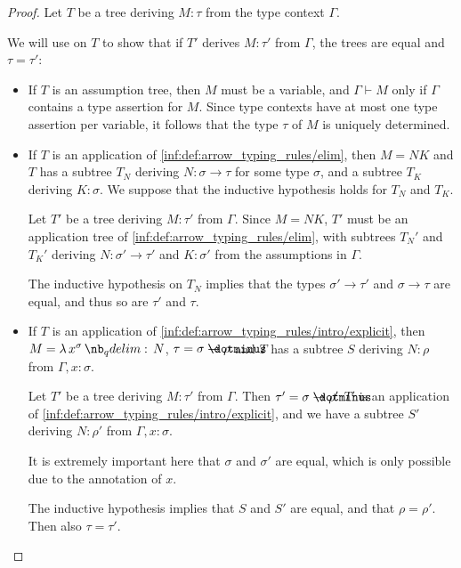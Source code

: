 \begin{proof}
  Let \( T \) be a tree deriving \( M: \tau \) from the type context \( \Gamma \).

  We will use  on \( T \) to show that if \( T' \) derives \( M: \tau' \) from \( \Gamma \), the trees are equal and \( \tau = \tau' \):
  \begin{itemize}
    \item If \( T \) is an assumption tree, then \( M \) must be a variable, and \( \Gamma \vdash M \) only if \( \Gamma \) contains a type assertion for \( M \). Since type contexts have at most one type assertion per variable, it follows that the type \( \tau \) of \( M \) is uniquely determined.

    \item If \( T \) is an application of \ref{inf:def:arrow_typing_rules/elim}, then \( M = NK \) and \( T \) has a subtree \( T_N \) deriving \( N: \sigma \to \tau \) for some type \( \sigma \), and a subtree \( T_K \) deriving \( K: \sigma \). We suppose that the inductive hypothesis holds for \( T_N \) and \( T_K \).

    Let \( T' \) be a tree deriving \( M: \tau' \) from \( \Gamma \). Since \( M = NK \), \( T' \) must be an application tree of \ref{inf:def:arrow_typing_rules/elim}, with subtrees \( T_N' \) and \( T_K' \) deriving \( N: \sigma' \to \tau' \) and \( K: \sigma' \) from the assumptions in \( \Gamma \).

    The inductive hypothesis on \( T_N \) implies that the types \( \sigma' \to \tau' \) and \( \sigma \to \tau \) are equal, and thus so are \( \tau' \) and \( \tau \).

    \item If \( T \) is an application of \ref{inf:def:arrow_typing_rules/intro/explicit}, then \( M = \qabs {x^\sigma} N \), \( \tau = \sigma \synimplies \rho \) and \( T \) has a subtree \( S \) deriving \( N: \rho \) from \( \Gamma, x: \sigma \).

    Let \( T' \) be a tree deriving \( M: \tau' \) from \( \Gamma \). Then \( \tau' = \sigma \synimplies \rho' \) \( T' \) is an application of \ref{inf:def:arrow_typing_rules/intro/explicit}, and we have a subtree \( S' \) deriving \( N: \rho' \) from \( \Gamma, x: \sigma \).

    It is extremely important here that \( \sigma \) and \( \sigma' \) are equal, which is only possible due to the annotation of \( x \).

    The inductive hypothesis implies that \( S \) and \( S' \) are equal, and that \( \rho = \rho' \). Then also \( \tau = \tau' \).
  \end{itemize}
\end{proof}
